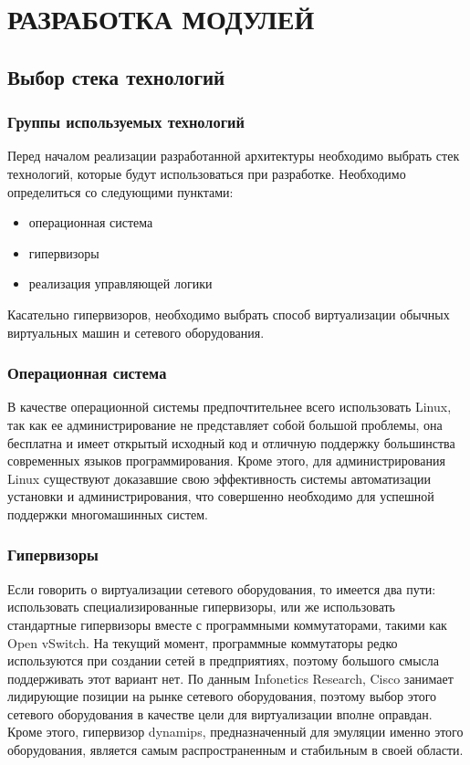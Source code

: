 \chapter{РАЗРАБОТКА МОДУЛЕЙ}

\section{Выбор стека технологий}

\subsection{Группы используемых технологий}
Перед началом реализации разработанной архитектуры необходимо выбрать
стек технологий, которые будут использоваться при разработке.
Необходимо определиться со следующими пунктами:
\begin{itemize}
    \item операционная система
    \item гипервизоры
    \item реализация управляющей логики
\end{itemize}
Касательно гипервизоров, необходимо выбрать способ виртуализации обычных виртуальных машин
и сетевого оборудования.

\subsection{Операционная система}
В качестве операционной системы предпочтительнее всего использовать Linux, так как ее 
администрирование не представляет собой большой проблемы, она бесплатна и имеет
открытый исходный код и отличную поддержку большинства современных языков 
программирования. Кроме этого, для администрирования Linux существуют доказавшие
свою эффективность системы автоматизации установки и администрирования, \cite{chef} \cite{puppet} \cite{fabric} что совершенно
необходимо для успешной поддержки многомашинных систем.

\subsection{Гипервизоры}
Если говорить о виртуализации сетевого оборудования, то имеется два пути: использовать
специализированные гипервизоры, или же использовать стандартные гипервизоры вместе с
программными коммутаторами, такими как Open vSwitch. На текущий момент, программные
коммутаторы редко используются при создании сетей в предприятиях, поэтому большого
смысла поддерживать этот вариант нет. По данным Infonetics Research, Cisco занимает
лидирующие позиции на рынке сетевого оборудования, \cite{infonetics-cisco}
поэтому выбор этого сетевого оборудования в качестве цели для виртуализации вполне оправдан.
Кроме этого, гипервизор dynamips, предназначенный для эмуляции именно этого оборудования,
является самым распространенным и стабильным в своей области. %

